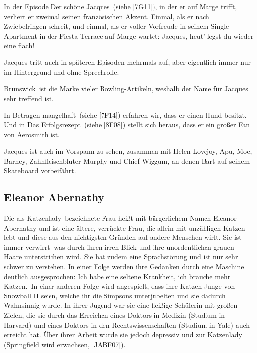 {In der Episode \glqq Der schöne Jacques\grqq\ (siehe \ref{7G11}), in der er auf Marge trifft, verliert er zweimal seinen französischen Akzent. Einmal, als er nach Zwiebelringen schreit, und einmal, als er voller Vorfreude in seinem Single-Apartment in der Fiesta Terrace auf Marge wartet: \glqq Jacques, heut' legst du wieder eine flach!\grqq 

Jacques tritt auch in späteren Episoden mehrmals auf, aber eigentlich immer nur im Hintergrund und ohne Sprechrolle.

\glqq Brunswick\grqq\ ist die Marke vieler Bowling-Artikeln, weshalb der Name für Jacques sehr treffend ist.

In \glqq Betragen mangelhaft\grqq\ (siehe \ref{7F14}) erfahren wir, dass er einen Hund besitzt. Und in \glqq Das Erfolgsrezept\grqq\ (siehe \ref{8F08}) stellt sich heraus, dass er ein großer Fan von Aerosmith ist.

Jacques ist auch im Vorspann zu sehen, zusammen mit Helen Lovejoy, Apu, Moe, Barney, Zahnfleischbluter Murphy und Chief Wiggum, an denen Bart auf seinem Skateboard vorbeifährt.


\subsection{Eleanor Abernathy}\label{EleanorAbernathy} 
Die als \glqq Katzenlady\grqq\ bezeichnete Frau heißt mit bürgerlichem Namen Eleanor Abernathy und ist eine ältere, verrückte Frau, die allein mit unzähligen Katzen lebt und diese aus den nichtigsten Gründen auf andere Menschen wirft. Sie ist immer verwirrt, was durch ihren irren Blick und ihre unordentlichen grauen Haare unterstrichen wird. Sie hat zudem eine Sprachstörung und ist nur sehr schwer zu verstehen. In einer Folge werden ihre Gedanken durch eine Maschine deutlich ausgesprochen: \glqq Ich habe eine seltene Krankheit, ich brauche mehr Katzen.\grqq\ In einer anderen Folge wird angespielt, dass ihre Katzen Junge von Snowball II seien, welche ihr die Simpsons unterjubelten und sie dadurch Wahnsinnig wurde. In ihrer Jugend war sie eine fleißige Schülerin mit großen Zielen, die sie durch das Erreichen eines Doktors in Medizin (Studium in Harvard) und eines Doktors in den Rechtswissenschaften (Studium in Yale) auch erreicht hat. Über ihrer Arbeit wurde sie jedoch depressiv und zur Katzenlady (\glqq Springfield wird erwachsen\grqq , \ref{JABF07}).

}
